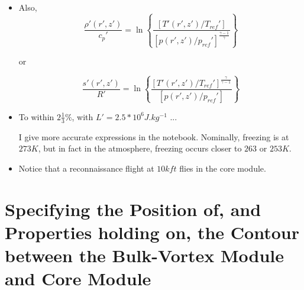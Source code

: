 \documentclass{article}
\begin{document}
\begin{itemize}
\item Also, 
\begin{equation}
	\frac{\rho'(r',z')}{c_p'} = \ln \left\{ \frac{ \left[ T'(r',z')/T_{ref}'\right] }{\left[ p(r',z')/p_{ref}' \right]^{\frac{\gamma-1}{\gamma}} }\right\}
\end{equation}

or

\begin{equation}
	\frac{s'(r',z')}{R'} = \ln \left\{ \frac{ \left[ T'(r',z')/T_{ref}'\right]^{\frac{\gamma}{\gamma-1}} }{\left[ p(r',z')/p_{ref}' \right] }\right\}
\end{equation}

\item To within $2 \frac{1}{3} \%$, with $L' =2.5 *10^6 \si{J.kg^{-1}}$ ...

I give more accurate expressions in the notebook. Nominally, freezing is at $273 \si{K}$, but in fact in the atmosphere, freezing occurs closer to $263$ or $253 \si{K}$.

\item Notice that a reconnaissance flight at $10 \si{kft}$ flies in the core module.

\end{itemize}

\section{Specifying the Position of, and Properties holding on, the Contour between the Bulk-Vortex Module and Core Module}

\begin{figure}[h!]
	\centering
	\def\svgwidth{0.7\columnwidth}
	
\end{figure}
\end{document}

